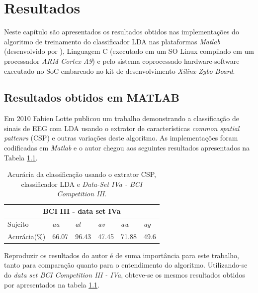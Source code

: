 \chapter[Resultados e Dicussão ]{Resultados}

Neste capítulo são apresentados os resultados obtidos nas implementações do algoritmo de treinamento do classificador LDA nas plataformas \textit{Matlab} (desenvolvido por \cite{F.Lotte}), Linguagem C (executado em um SO Linux compilado em um processador \textit{ARM Cortex A9}) e pelo sistema coprocessado hardware-software executado no SoC embarcado no kit de desenvolvimento \textit{Xilinx Zybo Board}.

\section{Resultados obtidos em MATLAB}
Em 2010 Fabien Lotte publicou um trabalho demonstrando a classificação de sinais de EEG com LDA \cite{F.Lotte} usando o extrator de características \textit{common spatial pattenrs} (CSP) e outras
variações deste algoritmo. 
As implementações foram codificadas em \textit{Matlab} e o autor chegou aos seguintes resultados apresentados na Tabela \ref{resultlotte}.

\begin{table}[h]
\centering
\caption{Acurácia da classificação usando o extrator CSP, classificador LDA e  \textit{Data-Set IVa - BCI Competition III}.}
\label{resultlotte}
\begin{tabular}{|l|l|l|l|l|l|}
\hline
\multicolumn{6}{|c|}{BCI III -  data set IVa}  \\ \hline
Sujeito & \textit{aa}    & \textit{al}    & \textit{av}    & \textit{aw}    & \textit{ay}   \\ \hline
Acurácia(\%)     & 66.07 & 96.43 & 47.45 & 71.88 & 49.6 \\ \hline
\end{tabular}
\end{table}
 
Reproduzir os resultados do autor é de suma importância para este trabalho, tanto para comparação quanto para o entendimento do algoritmo. Utilizando-se do \textit{data set BCI Competition III - IVa}, obteve-se os mesmos resultados obtidos por \cite{F.Lotte} apresentados na tabela \ref{resultlotte}.

